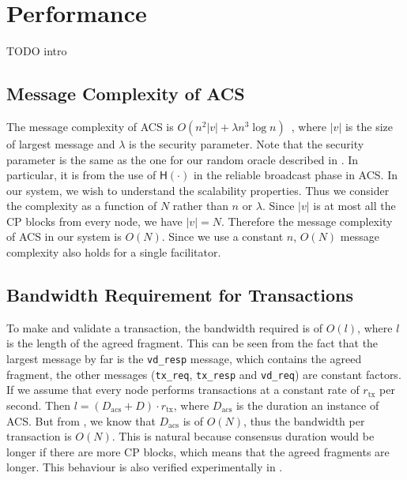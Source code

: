 \section{Performance}
TODO intro

\subsection{Message Complexity of ACS}
\label{sec:acs-complexity}
The message complexity of ACS is $O(n^2|v| + \lambda n^3 \log n)$~\cite{miller2016honey},
where $|v|$ is the size of largest message and $\lambda$ is the security parameter.
Note that the security parameter is the same as the one for our random oracle described in .
In particular, it is from the use of $\textsf{H}(\cdot)$ in the reliable broadcast phase in ACS.
In our system, we wish to understand the scalability properties.
Thus we consider the complexity as a function of $N$ rather than $n$ or $\lambda$.
Since $|v|$ is at most all the CP blocks from every node, we have $|v| = N$.
Therefore the message complexity of ACS in our system is $O(N)$.
Since we use a constant $n$, $O(N)$ message complexity also holds for a single facilitator.


\subsection{Bandwidth Requirement for Transactions}
To make and validate a transaction, the bandwidth required is of $O(l)$,
where $l$ is the length of the agreed fragment.
This can be seen from the fact that the largest message by far is the \texttt{vd\_resp} message,
which contains the agreed fragment,
the other messages (\texttt{tx\_req}, \texttt{tx\_resp} and \texttt{vd\_req}) are constant factors.
If we assume that every node performs transactions at a constant rate of $r_{\text{tx}}$ per second.
Then $l = (D_{\text{acs}} + D) \cdot r_{\text{tx}}$, where $D_{\text{acs}}$ is the duration an instance of ACS.
But from , we know that $D_{\text{acs}}$ is of $O(N)$, thus the bandwidth per transaction is $O(N)$.
This is natural because consensus duration would be longer if there are more CP blocks, which means that the agreed fragments are longer.
This behaviour is also verified experimentally in .


